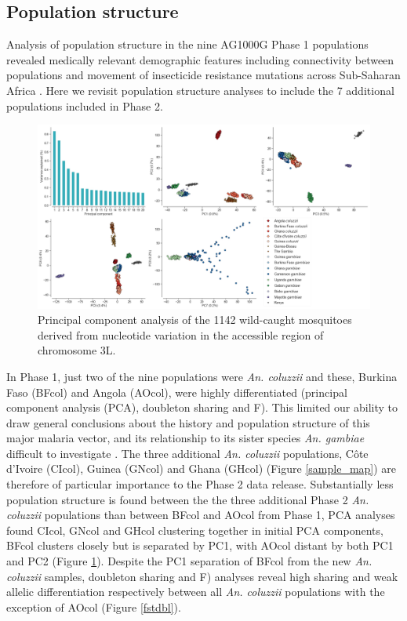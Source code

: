 \documentclass[a4paper,11pt,abstracton,hidelinks]{scrartcl}
\begin{document}
\subsection*{Population structure}

Analysis of population structure in the nine AG1000G Phase 1 populations revealed medically relevant demographic features including connectivity between populations and movement of insecticide resistance mutations across Sub-Saharan Africa \cite{Ag1000gConsortium2017}.
% 
Here we revisit population structure analyses to include the 7 additional populations included in Phase 2.

\begin{figure}[H]
	\begin{center}
		\includegraphics*[width=6.3in]{artwork/main_pca.jpeg}
	\end{center}
	\caption{Principal component analysis of the 1142 wild-caught mosquitoes derived from nucleotide variation in the accessible region of chromosome 3L.}
	\label{pca}
\end{figure}

%
In Phase 1, just two of the nine populations were \textit{An. coluzzii} and these, Burkina Faso (BFcol) and Angola (AOcol), were highly differentiated (principal component analysis (PCA), doubleton sharing and F).
%
This limited our ability to draw general conclusions about the history and population structure of this major malaria vector, and its relationship to its sister species \textit{An. gambiae} difficult to investigate \cite{Ag1000gConsortium2017}.
%
The three additional \textit{An. coluzzii} populations, C\^{o}te d'Ivoire (CIcol), Guinea (GNcol) and Ghana (GHcol) (Figure \ref{sample_map}) are therefore of particular importance to the Phase 2 data release.
%
Substantially less population structure is found between the the three additional Phase 2 \textit{An. coluzzii} populations than between BFcol and AOcol from Phase 1, 
%
PCA analyses found CIcol, GNcol and GHcol clustering together in initial PCA components, BFcol clusters closely but is separated by PC1, with AOcol distant by both PC1 and PC2 (Figure \ref{pca}).
%
Despite the PC1 separation of BFcol from the new \textit{An. coluzzii} samples, doubleton sharing and F) analyses reveal high sharing and weak allelic differentiation respectively between all \textit{An. coluzzii} populations with the exception of AOcol (Figure \ref{fstdbl}).
\end{document}
